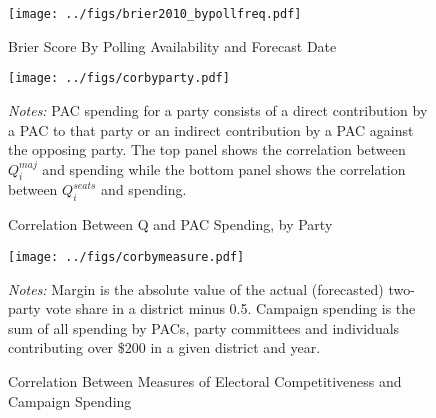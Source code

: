 \documentclass[12pt,final,fleqn]{article}
\theoremstyle{plain}
\begin{document}
\begin{figure}[!htb]
\begin{center}
\texttt{[image: ../figs/brier2010\_bypollfreq.pdf]}
\vspace{.5cm}
\caption{Brier Score By Polling Availability and Forecast Date}
\label{fig:Brier Score By Polling Availability and Forecast Date}
\begin{minipage}{\linewidth}
\footnotesize
\end{minipage}
\end{center}
\end{figure}

\begin{figure}[!htb]
\texttt{[image: ../figs/corbyparty.pdf]}
\vspace{.5cm}
\caption{Correlation Between Q and PAC Spending, by Party}
\label{fig:Correlation Between Q and PAC Spending, by Party}
\begin{minipage}{\linewidth}
\footnotesize
\emph{Notes:} PAC spending for a party consists of a direct contribution by a PAC to that party or an indirect contribution by a PAC against the opposing party. The top panel shows the correlation between $Q_i^{maj}$ and spending while the bottom panel shows the correlation between $Q_i^{seats}$ and spending.
\end{minipage}
\end{figure}

\begin{figure}[!htb]
\texttt{[image: ../figs/corbymeasure.pdf]}
\vspace{.5cm}
\caption{Correlation Between Measures of Electoral Competitiveness and Campaign Spending}
\label{fig:Correlation Between Measures of Electoral Competitiveness and Campaign Spending}
\begin{minipage}{\linewidth}
\footnotesize
\emph{Notes:} Margin is the absolute value of the actual (forecasted) two-party vote share in a district minus 0.5. Campaign spending is the sum of all spending by PACs, party committees and individuals contributing over \$200 in a given district and year.
\end{minipage}
\end{figure}






\end{document}
